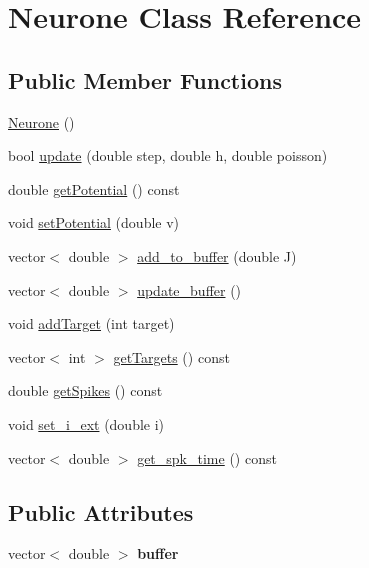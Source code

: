 \hypertarget{class_neurone}{}\section{Neurone Class Reference}
\label{class_neurone}
\subsection*{Public Member Functions}
\begin{DoxyCompactItemize}
\item 
\hyperlink{class_neurone_aaf4eaa15b62d4767ae4f523eb8b13b4a}{Neurone} ()
\item 
bool \hyperlink{class_neurone_a4eb0f77baa41d5f49c3e5e50abe19c68}{update} (double step, double h, double poisson)
\item 
double \hyperlink{class_neurone_a81f418a2929da23aa6122014e67e977a}{get\+Potential} () const 
\item 
void \hyperlink{class_neurone_af9a0ca4d5a2a020029fcb21b6c401669}{set\+Potential} (double v)
\item 
vector$<$ double $>$ \hyperlink{class_neurone_acea88a9694ccba14fc62b0fc4bffd41b}{add\+\_\+to\+\_\+buffer} (double J)
\item 
vector$<$ double $>$ \hyperlink{class_neurone_ac80cc9786bb14dfdde0ca81adec8a3ec}{update\+\_\+buffer} ()
\item 
void \hyperlink{class_neurone_a57969a7a7a0631ffd077196d210964ee}{add\+Target} (int target)
\item 
vector$<$ int $>$ \hyperlink{class_neurone_a168f0c14d1cde86301d2a7322a6def05}{get\+Targets} () const 
\item 
double \hyperlink{class_neurone_a00939e803852e0c94483ddf1c73ab74c}{get\+Spikes} () const 
\item 
void \hyperlink{class_neurone_ae4f57c275db9c37de0d7f2032992e2e7}{set\+\_\+i\+\_\+ext} (double i)
\item 
vector$<$ double $>$ \hyperlink{class_neurone_a9ceef3882d42416a36ce10cf50e35d04}{get\+\_\+spk\+\_\+time} () const 
\end{DoxyCompactItemize}
\subsection*{Public Attributes}
\begin{DoxyCompactItemize}
\item 
vector$<$ double $>$ {\bfseries buffer}\hypertarget{class_neurone_a4dfeae178d25ce2324c0c3070a8a6dcc}{}\label{class_neurone_a4dfeae178d25ce2324c0c3070a8a6dcc}

\end{DoxyCompactItemize}


